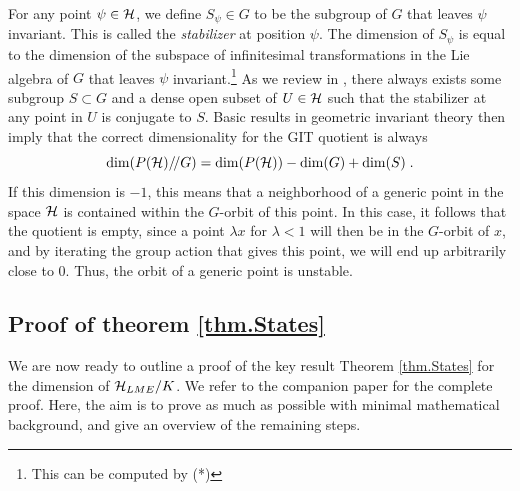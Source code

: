 \documentclass[12pt]{article}
\theoremstyle{definition}
\newcommand{\be}{\begin{equation}}
\newcommand{\ee}{\end{equation}}
\newcommand{\GITquot}{/\!/}
\begin{document}
For any point $\psi \in {\cal H}$, we define $S_\psi \in G$ to be the subgroup of $G$ that leaves $\psi$ invariant. This is called the {\it stabilizer} at position $\psi$. The dimension of $S_\psi$ is equal to the dimension of the subspace of infinitesimal transformations in the Lie algebra of $G$ that leaves $\psi$ invariant.\footnote{This can be computed by (*)} As we review in \cite{mathpaper}, there always exists some subgroup $S \subset G$ and a dense open subset of $U \in {\cal H}$ such that the stabilizer at any point in $U$ is conjugate to $S$. Basic results in geometric invariant theory then imply that the correct dimensionality for the GIT quotient is always
\be
\label{realdim}
{\rm dim}(P({\cal H})\GITquot G) = {\rm dim}(P({\cal H})) - {\rm dim}(G) + {\rm dim}(S)    \; .
\ee
If this dimension is $-1$, this means that a neighborhood of a generic point in the space ${\cal H}$ is contained within the $G$-orbit of this point. In this case, it follows that the quotient is empty, since a point $\lambda x$ for $\lambda < 1$ will then be in the $G$-orbit of $x$, and by iterating the group action that gives this point, we will end up arbitrarily close to 0. Thus, the orbit of a generic point is unstable.

\subsection{Proof of theorem \ref{thm.States}}

We are now ready to outline a proof of the key result Theorem \ref{thm.States} for the dimension of ${\cal H}_{LME}/K$. We refer to the companion paper \cite{mathpaper} for the complete proof. Here, the aim is to prove as much as possible with minimal mathematical background, and give an overview of the remaining steps.
\end{document}
